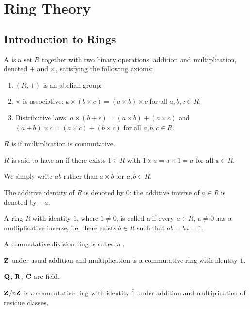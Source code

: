 \chapter{Ring Theory}\label{chap:ring-theory}
\section{Introduction to Rings}
\begin{definition}[Ring]
A  is a set $R$ together with two binary operations, addition and multiplication, denoted $+$ and $\times$, satisfying the following axioms:
\begin{enumerate}[label=(\roman*)]
\item $(R,+)$ is an abelian group;
\item $\times$ is associative: $a\times(b\times c)=(a\times b)\times c$ for all $a,b,c\in R$;
\item Distributive laws: $a\times(b+c)=(a\times b)+(a\times c)$ and $(a+b)\times c=(a\times c)+(b\times c)$ for all $a,b,c\in R$.
\end{enumerate}

$R$ is  if multiplication is commutative.

$R$ is said to have an  if there exists $1\in R$ with $1\times a=a\times1=a$ for all $a\in R$.
\end{definition}

\begin{notation}
We simply write $ab$ rather than $a\times b$ for $a,b\in R$.
\end{notation}

\begin{notation}
The additive identity of $R$ is denoted by $0$; the additive inverse of $a\in R$ is denoted by $-a$.
\end{notation}

\begin{definition}
A ring $R$ with identity $1$, where $1\neq0$, is called a  if every $a\in R$, $a\neq0$ has a multiplicative inverse, i.e. there exists $b\in R$ such that $ab=ba=1$.

A commutative division ring is called a .
\end{definition}

\begin{example}
$\mathbf Z$ under usual addition and multiplication is a commutative ring with identity $1$.

$\mathbf Q$, $\mathbf R$, $\mathbf C$ are field.

$\mathbf Z/n\mathbf Z$ is a commutative ring with identity $\bar{1}$ under addition and multiplication of residue classes.
\end{example}

